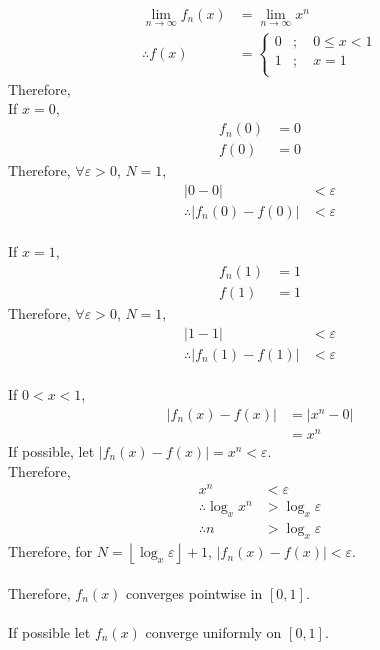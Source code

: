 \documentclass[fleqn, a4paper, 8pt, twoside]{amsart}
\theoremstyle{definition}
\theoremstyle{bluedefinition}
\theoremstyle{redtheorem}
\begin{document}
\begin{multicols}{2}
\begin{spacing}{0.7}
\begin{solution}
	\begin{align*}
		\lim\limits_{n \to \infty} f_n(x) & = \lim\limits_{n \to \infty} x^n \\
		\therefore f(x)                   & =
			\begin{cases}
				0 & ;\quad 0 \le x < 1 \\
				1 & ;\quad x = 1       \\
			\end{cases}
	\end{align*}
	Therefore,\\
	If $x = 0$,
	\begin{align*}
		f_n(0) &= 0\\
		f(0) &= 0
	\end{align*}
	Therefore, $\forall \varepsilon > 0$, $N = 1$,
	\begin{align*}
		|0 - 0| &< \varepsilon\\
		\therefore |f_n(0) - f(0)| &< \varepsilon
	\end{align*}
	~\\
	If $x = 1$,
	\begin{align*}
		f_n(1) &= 1\\
		f(1) &= 1
	\end{align*}
	Therefore, $\forall \varepsilon > 0$, $N = 1$,
	\begin{align*}
		|1 - 1| &< \varepsilon\\
		\therefore |f_n(1) - f(1)| &< \varepsilon
	\end{align*}
	~\\
	If $0 < x < 1$,
	\begin{align*}
		|f_n(x) - f(x)| &= |x^n - 0|\\
		&= x^n
	\end{align*}
	If possible, let $|f_n(x) - f(x)| = x^n < \varepsilon$.\\
	Therefore,
	\begin{align*}
		x^n &< \varepsilon\\
		\therefore \log_{x} x^n &> \log_{x} \varepsilon\\
		\therefore n &> \log_{x} \varepsilon
	\end{align*}
	Therefore, for $N = \left\lfloor \log_{x} \varepsilon \right\rfloor + 1$, $|f_n(x) - f(x)| < \varepsilon$.\\
	~\\
	Therefore, $f_n(x)$ converges pointwise in $[0,1]$.\\
	~\\
	If possible let $f_n(x)$ converge uniformly on $[0,1]$.\\

\end{solution}
\end{spacing}
\end{multicols}
\end{document}
